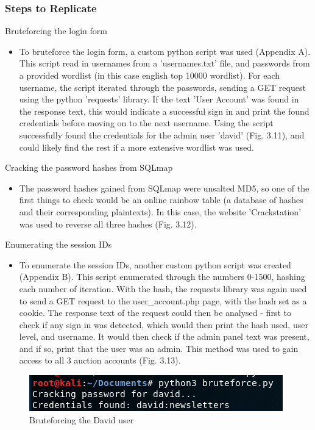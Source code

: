 \documentclass{report}
\begin{document}
\subsubsection{Steps to Replicate}
Bruteforcing the login form
\begin{itemize}
	\item To bruteforce the login form, a custom python script was used (Appendix A). This script read in usernames from a 'usernames.txt' file, and passwords from a provided wordlist (in this case english top 10000 wordlist). For each username, the script iterated through the passwords, sending a GET request using the python 'requests' library. If the text 'User Account' was found in the response text, this would indicate a successful sign in and print the found credentials before moving on to the next username.
	Using the script successfully found the credentials for the admin user 'david' (Fig. 3.11), and could likely find the rest if a more extensive wordlist was used.	
\end{itemize}
Cracking the password hashes from SQLmap
\begin{itemize}
	\item The password hashes gained from SQLmap were unsalted MD5, so one of the first things to check would be an online rainbow table (a database of hashes and their corresponding plaintexts). In this case, the website 'Crackstation' was used to reverse all three hashes (Fig. 3.12).
\end{itemize}
Enumerating the session IDs
\begin{itemize}
	\item To enumerate the session IDs, another custom python script was created (Appendix B). This script enumerated through the numbers 0-1500, hashing each number of iteration. With the hash, the requests library was again used to send a GET request to the user\_account.php page, with the hash set as a cookie. The response text of the request could then be analysed - first to check if any sign in was detected, which would then print the hash used, user level, and username. It would then check if the admin panel text was present, and if so, print that the user was an admin. This method was used to gain access to all 3 auction accounts (Fig. 3.13).
\end{itemize}
\begin{figure}[!htb]
	\centering
	\includegraphics[scale=0.7]{img/bruteforce1.png}
	\caption{Bruteforcing the David user}
\end{figure}
\end{document}

